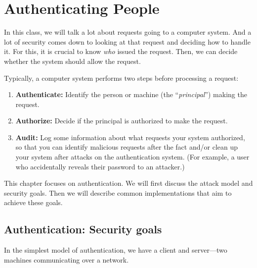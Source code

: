 \chapter{Authenticating People}

In this class, we will talk a lot about requests
going to a computer system.
And a lot of security comes down to looking at that request and deciding
how to handle it.
For this, it is crucial to know
\textit{who} issued the request. Then, we can
decide whether the system should allow the request. 

Typically, a computer system performs two steps before processing
a request:
\begin{enumerate}
  \item \textbf{Authenticate:} Identify the person 
          or machine (the ``\emph{principal}'') making the request.
  \item \textbf{Authorize:} Decide if the principal 
          is authorized to make the request.
  \item \textbf{Audit:} Log some information about what
          requests your system authorized, so that you can 
          identify malicious requests after the fact and/or
          clean up your system after attacks on the authentication
          system. (For example, a user who accidentally reveals
          their password to an attacker.)
\end{enumerate}

This chapter focuses on authentication.
We will first discuss the attack model and security goals.
Then we will describe common implementations 
that aim to achieve these goals.

\section{Authentication: Security goals}

In the simplest model of authentication, we have a client
and server---two machines communicating over a network.

